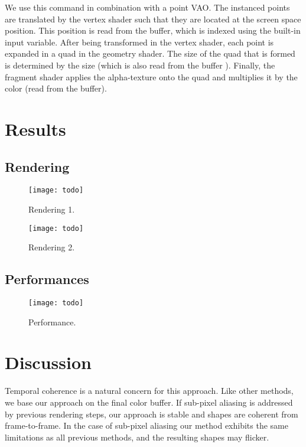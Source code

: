 We use this command in combination with a point VAO. The instanced points are translated by the vertex shader such that they are located at the screen space \bokeh position. This position is read from the  buffer, which is indexed using the built-in  input variable. After being transformed in the vertex shader, each point is expanded in a quad in the geometry shader. The size of the quad that is formed is determined by the \bokeh size (which is also read from the  buffer ). Finally, the fragment shader applies the \bokeh alpha-texture onto the quad and multiplies it by the \bokeh color (read from the  buffer).

\section{Results}

\subsection{Rendering}
	\begin{figure}[htb]\centering
	\texttt{[image: todo]}
	\caption{Rendering 1.}
	\label{YourName:fig1}
	\end{figure}

	\begin{figure}[htb]\centering
	\texttt{[image: todo]}
	\caption{Rendering 2.}
	\label{YourName:fig1}
	\end{figure}

\subsection{Performances}
	\begin{figure}[htb]\centering
	\texttt{[image: todo]}
	\caption{Performance.}
	\label{YourName:fig1}
	\end{figure}

\section{Discussion}
Temporal coherence is a natural concern for this approach. Like other methods, we base our approach on the final color buffer. If sub-pixel aliasing is addressed by previous rendering steps, our approach is stable and \bokeh shapes are coherent from frame-to-frame. In the case of sub-pixel aliasing our method exhibits the same limitations as all previous methods, and the resulting \bokeh shapes may flicker.


